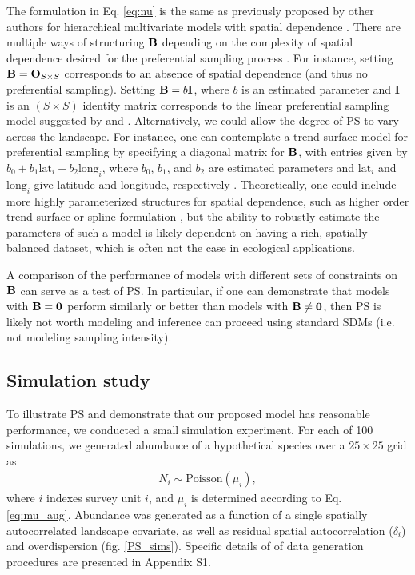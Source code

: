 \documentclass[times,mee,doublespace,]{besauth2}
\begin{document}
 The formulation in Eq. \ref{eq:nu} is the same as previously proposed by other authors for hierarchical multivariate models with spatial dependence \citep[cf.][]{RoyleBerliner1999}.  There are multiple ways of structuring ${\bf B}$ depending on the complexity of spatial dependence desired for the preferential sampling process \citep{RoyleBerliner1999}.  For instance, setting ${\bf B} = {\bf O}_{S \times S}$ corresponds to an absence of spatial dependence (and thus no preferential sampling).  Setting ${\bf B} = b {\bf I}$, where $b$ is an estimated parameter and {\bf I} is an $(S \times S)$ identity matrix corresponds to the linear preferential sampling model suggested by \citet{DiggleEtAl2010} and \citet{PatiEtAl2011}.  Alternatively, we could allow the degree of PS to vary across the landscape.  For instance, one can contemplate a trend surface model for preferential sampling by specifying a diagonal matrix for ${\bf B}$, with entries given by $b_0 + b_1 \textrm{lat}_i + b_2 \textrm{long}_i$, where $b_0$, $b_1$, and $b_2$ are estimated parameters and $\textrm{lat}_i$ and $\textrm{long}_i$ give latitude and longitude, respectively \citep{RoyleBerliner1999}.  Theoretically, one could include more highly parameterized structures for spatial dependence, such as higher order trend surface or spline formulation \citep{RoyleBerliner1999}, but the ability to robustly estimate the parameters of such a model is likely dependent on having a rich, spatially balanced dataset, which is often not the case in ecological applications.

A comparison of the performance of models with different sets of constraints on ${\bf B}$ can serve as a test of PS.  In particular, if one can demonstrate that models with ${\bf B}={\bf 0}$ perform similarly or better than models with ${\bf B} \ne {\bf 0}$, then PS is likely not worth modeling and inference can proceed using standard SDMs (i.e. not modeling sampling intensity).


\subsection{Simulation study}

To illustrate PS and demonstrate that our proposed model has reasonable performance, we conducted a small simulation experiment.  For each of 100 simulations, we generated abundance of a hypothetical species over a $25 \times 25$ grid as
\begin{eqnarray*}
  N_i \sim \textrm{Poisson}(\mu_i),
\end{eqnarray*}
where $i$ indexes survey unit $i$, and $\mu_i$ is determined according to Eq. \ref{eq:mu_aug}. Abundance was generated as a function of a single spatially autocorrelated landscape covariate, as well as residual spatial autocorrelation ($\delta_i$) and overdispersion (fig. \ref{PS_sims}). Specific details of of data generation procedures are presented in Appendix S1.
\end{document}
